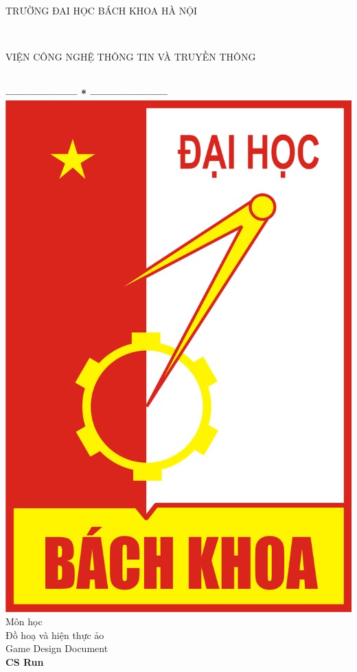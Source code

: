 \documentclass[14pt,a4paper]{extreport}
\begin{document}
	
\thispagestyle{empty}
\thisfancypage{
	\setlength{\fboxsep}{10pt}
	\fbox}{}
\begin{center}
	\begin{large}
		TRƯỜNG ĐAI HỌC BÁCH KHOA HÀ NỘI
	\end{large} \\
	\begin{large}
		VIỆN CÔNG NGHỆ THÔNG TIN VÀ TRUYỀN THÔNG
	\end{large} \\
	
	\textbf{--------------------  *  ---------------------}\\[1.5cm]
	\includegraphics[scale=0.25]{Logo_Hust.png}
	\\
	\vspace{1.5cm}
	{\fontsize{17pt}{1}\selectfont  Môn học}\\[0.3cm]
	{\fontsize{20pt}{1}\selectfont 	Đồ hoạ và hiện thực ảo}\\[0.9cm]
	{\fontsize{17pt}{1}\selectfont  Game Design Document}\\[0.5cm]
	{\fontsize{28pt}{1}\selectfont \textbf{CS Run}}\\[1.3cm]
\end{center}
\end{document}
